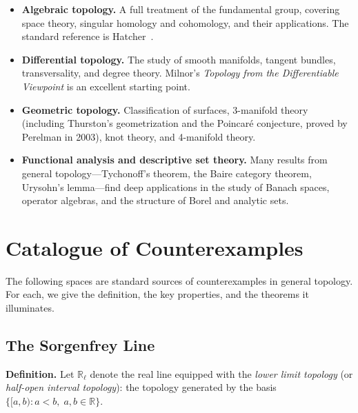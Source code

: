 \documentclass[11pt,a4paper,twoside]{book}
\theoremstyle{remark}
\theoremstyle{definition}
\theoremstyle{definition}
\begin{document}
\begin{itemize}
  \item \textbf{Algebraic topology.}  A full treatment of the
        fundamental group, covering space theory, singular homology and
        cohomology, and their applications.  The standard reference is
        Hatcher~\cite{hatcher}.
  \item \textbf{Differential topology.}  The study of smooth manifolds,
        tangent bundles, transversality, and degree theory.  Milnor's
        \emph{Topology from the Differentiable Viewpoint} is an
        excellent starting point.
  \item \textbf{Geometric topology.}  Classification of surfaces,
        3-manifold theory (including Thurston's geometrization and the
        Poincar\'{e} conjecture, proved by Perelman in 2003), knot theory,
        and 4-manifold theory.
  \item \textbf{Functional analysis and descriptive set theory.}  Many
        results from general topology---Tychonoff's theorem, the
        Baire category theorem, Urysohn's lemma---find deep
        applications in the study of Banach spaces, operator algebras,
        and the structure of Borel and analytic sets.
\end{itemize}



\appendix
\chapter{Catalogue of Counterexamples}
\label{app:counterexamples}

The following spaces are standard sources of counterexamples in general
topology.  For each, we give the definition, the key properties, and
the theorems it illuminates.

\section{The Sorgenfrey Line}
\label{app:sorgenfrey-line}

\textbf{Definition.}
Let $\mathbb{R}_\ell$ denote the real line equipped with the
\emph{lower limit topology} (or \emph{half-open interval topology}):
the topology generated by the basis $\{[a,b) : a<b,\; a,b\in\mathbb{R}\}$.
\end{document}
